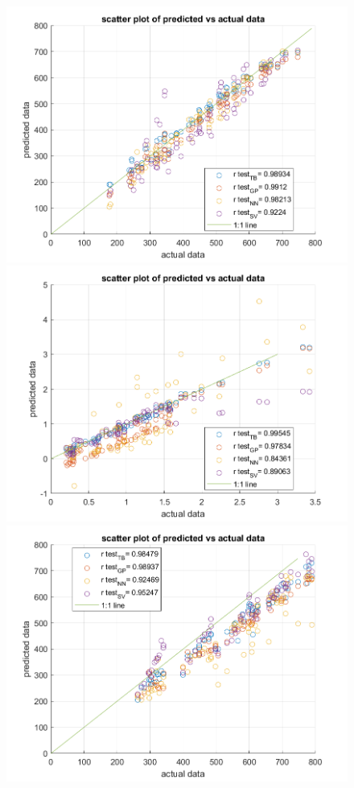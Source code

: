 \documentclass[12pt]{iopart}
\begin{document}
\begin{figure}[ht!]
\begin{center}
\begin{minipage}{0.495\textwidth}
    \includegraphics[width=1\textwidth]{volt1_2.5T.png}
\end{minipage}
\begin{minipage}{0.495\textwidth}
    \includegraphics[width=1\textwidth]{current1_2.5T.png}
\end{minipage}
\begin{minipage}{0.495\textwidth}
    \includegraphics[width=1\textwidth]{volt1500mT.png}

\end{minipage}
\end{center}
\end{figure}
\end{document}
